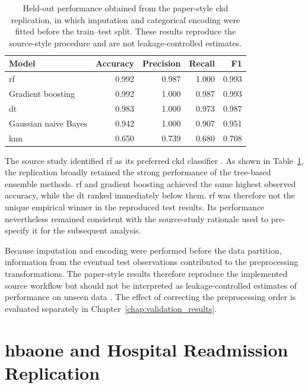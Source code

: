 \begin{table}[htbp]
    \centering
    \small
    \caption{Held-out performance obtained from the paper-style \gls{ckd} replication, in which imputation and categorical encoding were fitted before the train--test split. These results reproduce the source-style procedure and are not leakage-controlled estimates.}
    \label{tab:ckd_replication_results}
    \begin{tabular}{@{}lrrrr@{}}
        \toprule
        \textbf{Model} & \textbf{Accuracy} & \textbf{Precision} & \textbf{Recall} & \textbf{F1} \\
        \midrule
        \Gls{rf} & 0.992 & 0.987 & 1.000 & 0.993 \\
        Gradient boosting & 0.992 & 1.000 & 0.987 & 0.993 \\
        \Gls{dt} & 0.983 & 1.000 & 0.973 & 0.987 \\
        Gaussian naive Bayes & 0.942 & 1.000 & 0.907 & 0.951 \\
        \Gls{knn} & 0.650 & 0.739 & 0.680 & 0.708 \\
        \bottomrule
    \end{tabular}
\end{table}

The source study identified \gls{rf} as its preferred \gls{ckd} classifier \citep{santhiya_chronic_2024}. As shown in Table~\ref{tab:ckd_replication_results}, the replication broadly retained the strong performance of the tree-based ensemble methods. \Gls{rf} and gradient boosting achieved the same highest observed accuracy, while the \gls{dt} ranked immediately below them. \Gls{rf} was therefore not the unique empirical winner in the reproduced test results. Its performance nevertheless remained consistent with the source-study rationale used to pre-specify it for the subsequent analysis.

Because imputation and encoding were performed before the data partition, information from the eventual test observations contributed to the preprocessing transformations. The paper-style results therefore reproduce the implemented source workflow but should not be interpreted as leakage-controlled estimates of performance on unseen data \citep{collins_tripodai_2024, moons_probastai_2025}. The effect of correcting the preprocessing order is evaluated separately in Chapter~\ref{chap:validation_results}.

\section{\gls{hbaone} and Hospital Readmission Replication}

